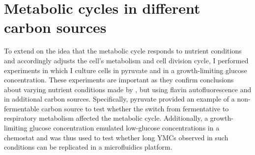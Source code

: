\section{Metabolic cycles in different carbon sources}
\label{sec:biology-carbon}

To extend on the idea that the metabolic cycle responds to nutrient conditions and accordingly adjusts the cell's metabolism and cell division cycle, I performed experiments in which I culture cells in pyruvate and in a growth-limiting glucose concentration.
These experiments are important as they confirm conclusions about varying nutrient conditions made by \textcite{papagiannakisAutonomousMetabolicOscillations2017},
but using flavin autofluorescence and in additional carbon sources.
Specifically, pyruvate provided an example of a non-fermentable carbon source to test whether the switch from fermentative to respiratory metabolism affected the metabolic cycle.
Additionally, a growth-limiting glucose concentration emulated low-glucose concentrations in a chemostat and was thus used to test whether long YMCs observed in such conditions can be replicated in a microfluidics platform.

